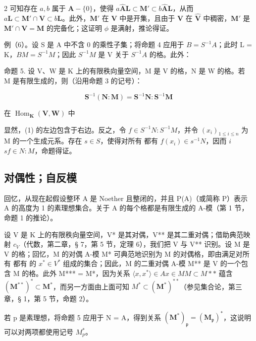 2 可知存在 \(a, b\) 属于 \(\mathbf{A} - \{0\}\)，使得 \(a\hat{\mathbf{A}}\mathbf{L} \subset \mathbf{M}' \subset b\hat{\mathbf{A}}\mathbf{L}\)，从而 \(a\mathbf{L} \subset \mathbf{M}' \cap \mathbf{V} \subset b\mathbf{L}\)。此外，\(\mathbf{M}'\) 在 \(\mathbf{V}\) 中是开集，且由于 \(\mathbf{V}\) 在 \(\hat{\mathbf{V}}\) 中稠密，\(\mathbf{M}'\) 是 \(\mathbf{M}' \cap \mathbf{V} = \mathbf{M}\) 的完备化；这证明 \(\phi\) 是满射，推论得证。

例（6）。设 S 是 A 中不含 0 的乘性子集；将命题 4 应用于 \(B = S^{-1}A\)；此时 L = K，\(BM = S^{-1}M\)；因此 \(S^{-1}M\) 是 V 关于 \(S^{-1}A\) 的格。此外：

命题 5. 设 V、W 是 K 上的有限秩向量空间，M 是 V 的格，N 是 W 的格。若 M 是有限生成的，则（沿用命题 3 的记号）：

\[
\mathbf {S} ^ {- 1} (\mathbf {N}: \mathbf {M}) = \mathbf {S} ^ {- 1} \mathbf {N}: \mathbf {S} ^ {- 1} \mathbf {M}\tag{1}
\]

在 \(\operatorname{Hom}_{\mathbf{K}}(\mathbf{V},\mathbf{W})\) 中

显然，(1) 的左边包含于右边。反之，令 \(f \in S^{-1}N: S^{-1}M\)，并令 \((x_i)_{1 \leqslant i \leqslant n}\) 为 M 的一个生成元系。存在 \(s \in S\)，使得对所有  都有 \(f(x_i) \in s^{-1}N\)，因而 \(i\)\(sf \in N: M\)，命题得证。

\subsection{对偶性；自反模}

回忆，从现在起假设整环 A 是 Noether 且整闭的，并且 P(A)（或简称 P）表示 A 的高度为 1 的素理想集合。关于 A 的每个格都是有限生成的 A-模（第 1 节，命题 1 的推论）。

设 V 是 K 上的有限秩向量空间，V* 是其对偶，V** 是其二重对偶；借助典范映射 \(c_{V}\)（代数，第二章，§ 7，第 5 节，定理 6），我们把 V 与 V** 识别。设 M 是 V 的格；回忆，M 的对偶 A-模 M* 可典范地识别为 M 的对偶格，即由满足对所有  都有  的 \(x^{*} \in V^{*}\) 组成的集合；因此，M 的二重对偶 A-模 M** 是 V 的一个包含 M 的格。此外 M*** = M*，因为关系 \(\langle x, x^{*} \rangle \in A\)\(x \in M\)\(M \subset M**\) 蕴含 \((\mathbf{M}^{**})^{*} \subset \mathbf{M}^{*}\)，而另一方面由上面可知 \(M^{*} \subset (\mathbf{M}^{*})^{**}\)（参见集合论，第三章，§ 1，第 5 节，命题 2）。

若 p 是素理想，将命题 5 应用于 N = A，得到关系 \((\mathbf{M}^{*})_{\mathfrak{p}} = (\mathbf{M}_{\mathfrak{p}})^{*}\)，这说明可以对两项都使用记号 \(M_{p}^{*}\)。

